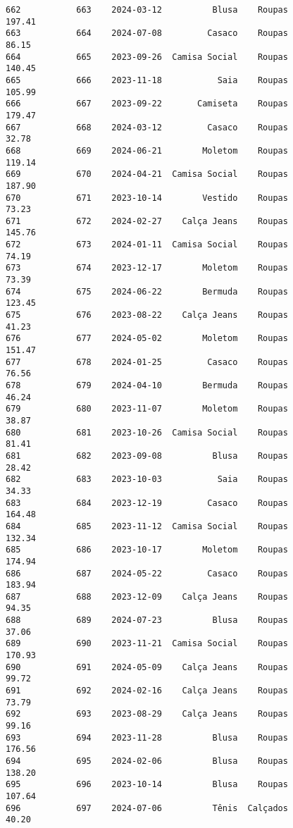 \documentclass[11pt]{article}
\begin{document}
\begin{Verbatim}[commandchars=\\\{\}]
662           663    2024-03-12          Blusa    Roupas          197.41   
663           664    2024-07-08         Casaco    Roupas           86.15   
664           665    2023-09-26  Camisa Social    Roupas          140.45   
665           666    2023-11-18           Saia    Roupas          105.99   
666           667    2023-09-22       Camiseta    Roupas          179.47   
667           668    2024-03-12         Casaco    Roupas           32.78   
668           669    2024-06-21        Moletom    Roupas          119.14   
669           670    2024-04-21  Camisa Social    Roupas          187.90   
670           671    2023-10-14        Vestido    Roupas           73.23   
671           672    2024-02-27    Calça Jeans    Roupas          145.76   
672           673    2024-01-11  Camisa Social    Roupas           74.19   
673           674    2023-12-17        Moletom    Roupas           73.39   
674           675    2024-06-22        Bermuda    Roupas          123.45   
675           676    2023-08-22    Calça Jeans    Roupas           41.23   
676           677    2024-05-02        Moletom    Roupas          151.47   
677           678    2024-01-25         Casaco    Roupas           76.56   
678           679    2024-04-10        Bermuda    Roupas           46.24   
679           680    2023-11-07        Moletom    Roupas           38.87   
680           681    2023-10-26  Camisa Social    Roupas           81.41   
681           682    2023-09-08          Blusa    Roupas           28.42   
682           683    2023-10-03           Saia    Roupas           34.33   
683           684    2023-12-19         Casaco    Roupas          164.48   
684           685    2023-11-12  Camisa Social    Roupas          132.34   
685           686    2023-10-17        Moletom    Roupas          174.94   
686           687    2024-05-22         Casaco    Roupas          183.94   
687           688    2023-12-09    Calça Jeans    Roupas           94.35   
688           689    2024-07-23          Blusa    Roupas           37.06   
689           690    2023-11-21  Camisa Social    Roupas          170.93   
690           691    2024-05-09    Calça Jeans    Roupas           99.72   
691           692    2024-02-16    Calça Jeans    Roupas           73.79   
692           693    2023-08-29    Calça Jeans    Roupas           99.16   
693           694    2023-11-28          Blusa    Roupas          176.56   
694           695    2024-02-06          Blusa    Roupas          138.20   
695           696    2023-10-14          Blusa    Roupas          107.64   
696           697    2024-07-06          Tênis  Calçados           40.20   

\end{Verbatim}
\end{document}
